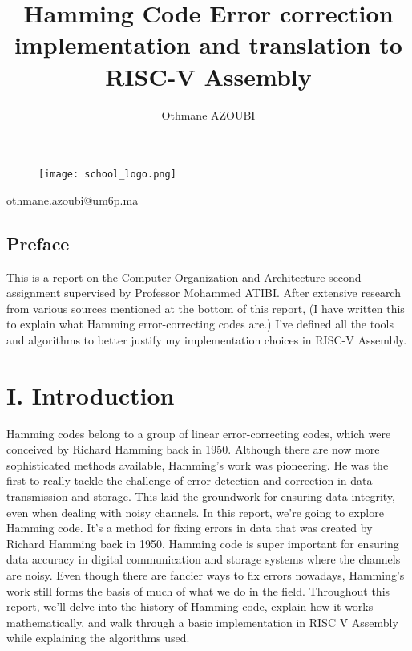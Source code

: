 \documentclass[11pt]{article}
\begin{document}
\begin{figure}[t]
    \centering
    \texttt{[image: school\_logo.png]}
\end{figure}

\title{Hamming Code Error correction implementation and translation to RISC-V Assembly}
\author{Othmane AZOUBI}
\maketitle

\begin{center}
othmane.azoubi@um6p.ma
\end{center}

\vspace*{\fill}

\begin{center}
\section*{Preface}
\large
This is a report on the Computer Organization and Architecture second assignment supervised by Professor Mohammed ATIBI. 
\newline 
After extensive research from various sources mentioned at the bottom of this report, (I have written this to explain what Hamming error-correcting codes are.) I've defined all the tools and algorithms to better justify my implementation choices in RISC-V Assembly.
\end{center}

\vspace*{\fill}

\newpage

\section*{I. Introduction}
Hamming codes belong to a group of linear error-correcting codes, which were conceived by Richard Hamming back in 1950. Although there are now more sophisticated methods available, Hamming's work was pioneering. He was the first to really tackle the challenge of error detection and correction in data transmission and storage. This laid the groundwork for ensuring data integrity, even when dealing with noisy channels.
\newline
In this report, we're going to explore Hamming code. It's a method for fixing errors in data that was created by Richard Hamming back in 1950. Hamming code is super important for ensuring data accuracy in digital communication and storage systems where the channels are noisy. Even though there are fancier ways to fix errors nowadays, Hamming's work still forms the basis of much of what we do in the field.
\newline
Throughout this report, we'll delve into the history of Hamming code, explain how it works mathematically, and walk through a basic implementation in RISC V Assembly while explaining the algorithms used.
\end{document}
